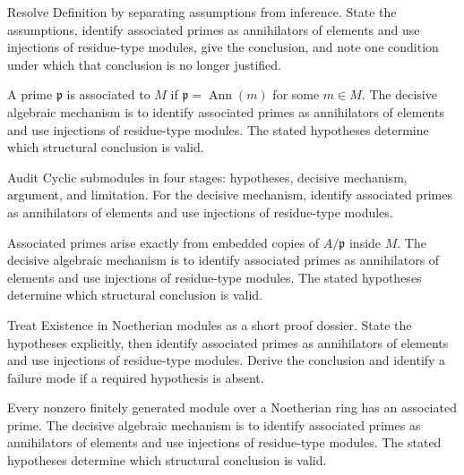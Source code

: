 \begin{problem}\label{prob:v17-problem-01}
Resolve Definition by separating assumptions from inference. State the assumptions, identify associated primes as annihilators of elements and use injections of residue-type modules, give the conclusion, and note one condition under which that conclusion is no longer justified.
\end{problem}
\begin{solution}
A prime $\mathfrak p$ is associated to $M$ if $\mathfrak p=\operatorname{Ann}(m)$ for some $m\in M$. The decisive algebraic mechanism is to identify associated primes as annihilators of elements and use injections of residue-type modules. The stated hypotheses determine which structural conclusion is valid.
\end{solution}

\begin{problem}\label{prob:v17-problem-02}
Audit Cyclic submodules in four stages: hypotheses, decisive mechanism, argument, and limitation. For the decisive mechanism, identify associated primes as annihilators of elements and use injections of residue-type modules.
\end{problem}
\begin{solution}
Associated primes arise exactly from embedded copies of $A/\mathfrak p$ inside $M$. The decisive algebraic mechanism is to identify associated primes as annihilators of elements and use injections of residue-type modules. The stated hypotheses determine which structural conclusion is valid.
\end{solution}

\begin{problem}\label{prob:v17-problem-03}
Treat Existence in Noetherian modules as a short proof dossier. State the hypotheses explicitly, then identify associated primes as annihilators of elements and use injections of residue-type modules. Derive the conclusion and identify a failure mode if a required hypothesis is absent.
\end{problem}
\begin{solution}
Every nonzero finitely generated module over a Noetherian ring has an associated prime. The decisive algebraic mechanism is to identify associated primes as annihilators of elements and use injections of residue-type modules. The stated hypotheses determine which structural conclusion is valid.
\end{solution}

